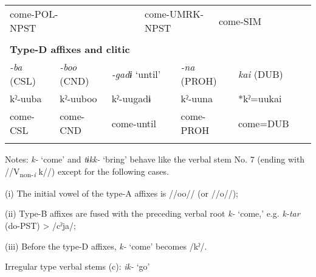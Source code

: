 \begin{tabularx}{\textwidth}{XXXXXXXXXXXXXXXXXXXXX}
\multicolumn{4}{X}{come-POL-NPST} & \multicolumn{4}{X}{} & \multicolumn{3}{X}{come-UMRK-NPST} & \multicolumn{10}{X}{come-SIM}\\
\multicolumn{21}{X}{}\\
\multicolumn{21}{X}{{\bfseries Type-D affixes and clitic}}\\
\multicolumn{3}{X}{{ \textit{{}-ba} (CSL)}} & \multicolumn{3}{X}{{ \textit{{}-boo} (CND)}} & \multicolumn{3}{X}{{ \textit{{}-gadɨ} ‘until’}} & \multicolumn{4}{X}{{ \textit{{}-na} (PROH)}} & \multicolumn{8}{X}{{ \textit{kai} (DUB)}}\\
\multicolumn{3}{X}{{ kˀ-uuba}} & \multicolumn{3}{X}{{ kˀ-uuboo}} & \multicolumn{3}{X}{{ kˀ-uugadɨ}} & \multicolumn{4}{X}{{ kˀ-uuna}} & \multicolumn{8}{X}{{ *kˀ=uukai}}\\
\multicolumn{3}{X}{come-CSL} & \multicolumn{3}{X}{come-CND} & \multicolumn{3}{X}{come-until} & \multicolumn{4}{X}{come-PROH} & \multicolumn{8}{X}{come=DUB}\\
\lspbottomrule
\end{tabularx}
Notes: \textit{k-} ‘come’ and \textit{tɨkk-} ‘bring’ behave like the verbal stem No. 7 (ending with //V\textsubscript{non-}\textit{\textsubscript{i}} k//) except for the following cases.

(i)  The initial vowel of the type-A affixes is //oo// (or //o//);

(ii)  Type-B affixes are fused with the preceding verbal root \textit{k-} ‘come,’ e.g. \textit{k-tar} (do-PST) > /cˀja/;

(iii)  Before the type-D affixes, \textit{k-} ‘come’ becomes /kˀ/.

Irregular type verbal stems (c): \textit{ik-} ‘go’

\tablefirsthead{}

